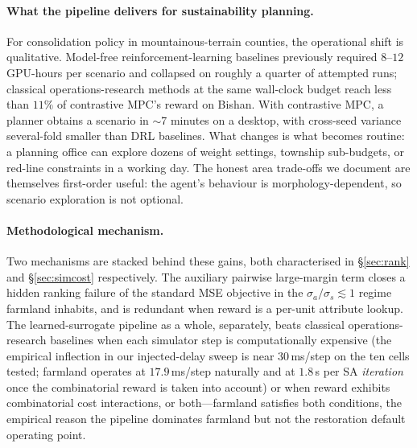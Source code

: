 \documentclass[11pt]{article}
\begin{document}
\paragraph{What the pipeline delivers for sustainability planning.} For consolidation policy in mountainous-terrain counties, the operational shift is qualitative. Model-free reinforcement-learning baselines previously required $8$--$12$ GPU-hours per scenario and collapsed on roughly a quarter of attempted runs; classical operations-research methods at the same wall-clock budget reach less than $11\%$ of contrastive MPC's reward on Bishan. With contrastive MPC, a planner obtains a scenario in $\sim$7 minutes on a desktop, with cross-seed variance several-fold smaller than DRL baselines. What changes is what becomes routine: a planning office can explore dozens of weight settings, township sub-budgets, or red-line constraints in a working day. The honest area trade-offs we document are themselves first-order useful: the agent's behaviour is morphology-dependent, so scenario exploration is not optional.

\paragraph{Methodological mechanism.} Two mechanisms are stacked behind these gains, both characterised in §\ref{sec:rank} and §\ref{sec:simcost} respectively. The auxiliary pairwise large-margin term closes a hidden ranking failure of the standard MSE objective in the $\sigma_a/\sigma_s \!\lesssim\! 1$ regime farmland inhabits, and is redundant when reward is a per-unit attribute lookup. The learned-surrogate pipeline as a whole, separately, beats classical operations-research baselines when each simulator step is computationally expensive (the empirical inflection in our injected-delay sweep is near $30$\,ms/step on the ten cells tested; farmland operates at $17.9$\,ms/step naturally and at $1.8$\,s per SA \emph{iteration} once the combinatorial reward is taken into account) or when reward exhibits combinatorial cost interactions, or both---farmland satisfies both conditions, the empirical reason the pipeline dominates farmland but not the restoration default operating point.
\end{document}
